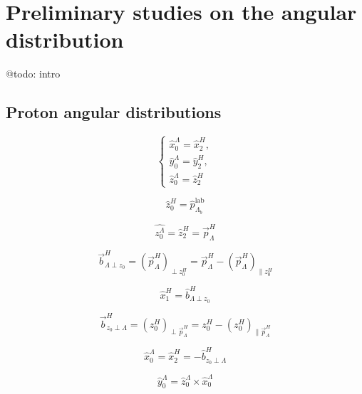 \chapter{Preliminary studies on the \texorpdfstring{\lambdadecay}{Lambda baryon decay} angular distribution}
\label{cap:angular_distribution}

@todo: intro

\section{Proton angular distributions}

\begin{equation}
	\begin{cases}
		\hat{x}_0^\Lambda = \hat{x}_2^H, \\
		\hat{y}_0^\Lambda = \hat{y}_2^H, \\
		\hat{z}_0^\Lambda = \hat{z}_2^H
	\end{cases}
\end{equation}

\begin{equation}
	\hat{z}_0^H = \hat{p}_{\Lambda_b}^\text{lab}
\end{equation}

\begin{equation}
	\hat{z_0^\Lambda} = \hat{z}_2^H = \vec{p}_\Lambda^H
\end{equation}

\begin{equation}
	\vec{b}_{\Lambda \perp z_0}^H
	=
	\left(\vec{p}_\Lambda^H\right)_{\perp z_0^H}
	=
	\vec{p}_\Lambda^H - \left(\vec{p}_\Lambda^H\right)_{\parallel z_0^H}
\end{equation}

\begin{equation}
	\hat{x}_1^H = \hat{b}^H_{\Lambda \perp z_0}
\end{equation}

\begin{equation}
	\vec{b}^H_{z_0 \perp \Lambda}
	=
	\left(z_0^H\right)_{\perp \vec{p}_\Lambda^H}
	=
	z_0^H - \left(z_0^H\right)_{\parallel \vec{p}_\Lambda^H}
\end{equation}

\begin{equation}
	\hat{x}_0^\Lambda = \hat{x}_2^H
	=
	- \hat{b}^H_{z_0 \perp \Lambda}
\end{equation}

\begin{equation}
	\hat{y}_0^\Lambda = \hat{z}_0^\Lambda \times \hat{x}_0^\Lambda
\end{equation}


